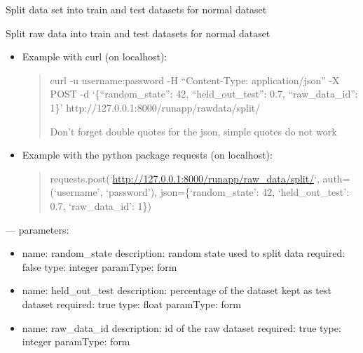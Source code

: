 \documentclass[letterpaper,10pt,english]{sphinxmanual}
\begin{document}
\begin{fulllineitems}
\label{modules/views:runapp.views.SplitTrainTest}
Split data set into train and test datasets for normal dataset

\begin{fulllineitems}
\label{modules/views:runapp.views.SplitTrainTest.post}
Split raw data into train and test datasets for normal dataset
\begin{itemize}
\item {} 
Example with curl (on localhost):
\begin{quote}

curl -u username:password -H ``Content-Type: application/json''            -X POST            -d `\{``random\_state'': 42, ``held\_out\_test'': 0.7, ``raw\_data\_id'': 1\}'                http://127.0.0.1:8000/runapp/rawdata/split/

Don't forget double quotes for the json, simple quotes do not work
\end{quote}

\item {} 
Example with the python package requests (on localhost):
\begin{quote}

requests.post(`\url{http://127.0.0.1:8000/runapp/raw\_data/split/}`,                          auth=(`username', `password'),                          json=\{`random\_state': 42, `held\_out\_test': 0.7,                                `raw\_data\_id': 1\})
\end{quote}

\end{itemize}

---
parameters:
\begin{itemize}
\item {} 
name: random\_state
description: random state used to split data
required: false
type: integer
paramType: form

\item {} 
name: held\_out\_test
description: percentage of the dataset kept as test dataset
required: true
type: float
paramType: form

\item {} 
name: raw\_data\_id
description: id of the raw dataset
required: true
type: integer
paramType: form

\end{itemize}

\end{fulllineitems}


\end{fulllineitems}
\end{document}
